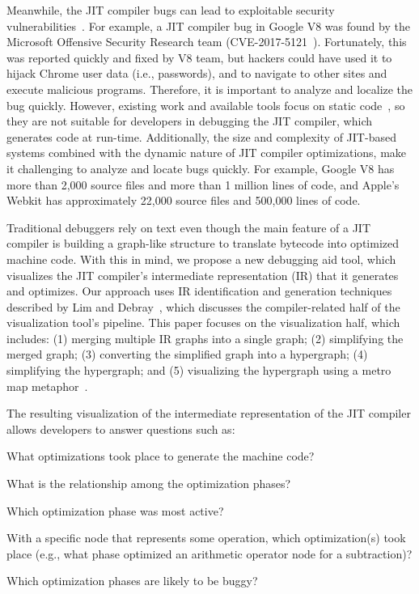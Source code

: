 \documentclass[runningheads]{llncs}
\begin{document}
Meanwhile, the JIT compiler bugs can lead to exploitable security vul\-ner\-abilities~\cite{rabet2017,issue5129,issue8056,issue1072172,issue961237}. For example, a JIT compiler bug in Google V8 was found by the Microsoft Offensive Security Research  team (CVE-2017-5121~\cite{rabet2017}). Fortunately, this was reported quickly and fixed by V8 team, but hackers could have used it  to hijack Chrome user data (i.e., passwords), and to navigate to other sites and execute malicious programs. Therefore, it is important to analyze and localize the bug quickly. However, existing work and available tools focus on static code~\cite{DBLP:conf/pldi/HolzleCU92,DBLP:conf/pldi/BrooksHS92,DBLP:conf/pldi/Adl-TabatabaiG96}, so they are not suitable for developers in debugging the JIT compiler, which generates code at run-time. Additionally, the size and complexity of JIT-based systems\cite{hinkelmann2017understanding} combined with the dynamic nature of JIT compiler optimizations, make it challenging to analyze and locate bugs quickly. For example, Google V8 has more than 2,000 source files and more than 1 million lines of code, and Apple's Webkit has approximately 22,000 source files and 500,000 lines of code. 

Traditional debuggers rely on text even though the main feature of a JIT compiler is building a graph-like structure to translate bytecode into optimized machine code. With this in mind, we propose a new debugging aid tool, which visualizes the JIT compiler's intermediate representation (IR) that it generates and optimizes. Our approach uses IR identification and generation techniques described by Lim and Debray~\cite{DBLP:conf/vee/LimD21}, which discusses the compiler-related half of the visualization tool's pipeline. This paper focuses on the visualization half, which includes: (1) merging multiple IR graphs into a single graph; (2) simplifying the merged graph; (3) converting the simplified graph into a hypergraph; (4) simplifying the hypergraph; and (5) visualizing the hypergraph using a metro map metaphor~\cite{DBLP:journals/tvcg/JacobsenWKN21}.

The resulting  visualization of the intermediate representation of the JIT compiler allows developers to answer questions such as:

\begin{compactenum}
\item What optimizations took place to generate the machine code?
\item What is the relationship among the optimization phases?
\item Which optimization phase was most active?
\item With a specific node that represents some operation, which optimization(s) took place (e.g., what phase optimized an arithmetic operator node for a subtraction)?
\item Which optimization phases are likely to be buggy?
\end{compactenum}
\end{document}
